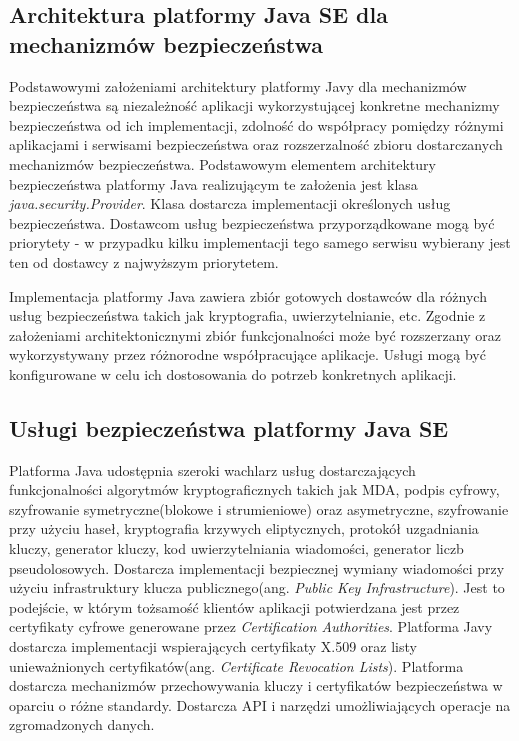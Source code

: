 	\subsection{Architektura platformy Java SE dla mechanizmów bezpieczeństwa}

		Podstawowymi założeniami architektury platformy Javy dla mechanizmów bezpieczeństwa są niezależność aplikacji wykorzystującej konkretne mechanizmy bezpieczeństwa od ich implementacji, zdolność do współpracy pomiędzy różnymi aplikacjami i serwisami bezpieczeństwa oraz rozszerzalność zbioru dostarczanych mechanizmów bezpieczeństwa. Podstawowym elementem architektury bezpieczeństwa platformy Java realizującym te założenia jest klasa \textit{java.security.Provider}. Klasa dostarcza implementacji określonych usług bezpieczeństwa. Dostawcom usług bezpieczeństwa przyporządkowane mogą być priorytety - w przypadku kilku implementacji tego samego serwisu wybierany jest ten od dostawcy z najwyższym priorytetem. 

		Implementacja platformy Java zawiera zbiór gotowych dostawców dla różnych usług bezpieczeństwa takich jak kryptografia, uwierzytelnianie, etc. Zgodnie z założeniami architektonicznymi zbiór funkcjonalności może być rozszerzany oraz wykorzystywany przez różnorodne współpracujące aplikacje. Usługi mogą być konfigurowane w celu ich dostosowania do potrzeb konkretnych aplikacji. 

	\subsection{Usługi bezpieczeństwa platformy Java SE}

		Platforma Java udostępnia szeroki wachlarz usług dostarczających funkcjonalności algorytmów kryptograficznych takich jak MDA, podpis cyfrowy, szyfrowanie symetryczne(blokowe i strumieniowe) oraz asymetryczne, szyfrowanie przy użyciu haseł, kryptografia krzywych eliptycznych, protokół uzgadniania kluczy, generator kluczy, kod uwierzytelniania wiadomości, generator liczb pseudolosowych. Dostarcza implementacji bezpiecznej wymiany wiadomości przy użyciu infrastruktury klucza publicznego(ang. \textit{Public Key Infrastructure}). Jest to podejście, w którym tożsamość klientów aplikacji potwierdzana jest przez certyfikaty cyfrowe generowane przez \textit{Certification Authorities}. Platforma Javy dostarcza implementacji wspierających certyfikaty X.509 oraz listy unieważnionych certyfikatów(ang. \textit{Certificate Revocation Lists}). Platforma dostarcza mechanizmów przechowywania kluczy i certyfikatów bezpieczeństwa w oparciu o różne standardy. Dostarcza API i narzędzi umożliwiających operacje na zgromadzonych danych.

